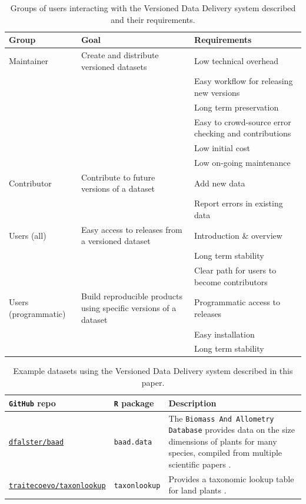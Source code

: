 \documentclass[english]{article}
\newcommand{\ghsmurl}[1]{{\footnotesize\href{https://github.com/#1}{\nolinkurl{#1}}}}
\begin{document}
\begin{table}[h!]
\centering
\caption{Groups of users interacting with the Versioned Data Delivery system described and their requirements.}
{\footnotesize
\vspace{1cm}
  \begin{tabular}{p{2cm}p{4cm}p{6cm}}
  \hline
  \textbf{Group} & \textbf{Goal} & \textbf{Requirements} \\ \hline
  Maintainer & Create and distribute versioned datasets & Low technical overhead \\
    & & Easy workflow for releasing new versions \\
    & & Long term preservation \\
    & & Easy to crowd-source error checking and contributions \\
    & & Low initial cost \\
    & & Low on-going maintenance \\
  Contributor & Contribute to future versions of a dataset & Add new data \\
    & & Report errors in existing data \\
  Users (all) & Easy access to releases from a versioned dataset & Introduction \& overview \\
    & & Long term stability \\
    & & Clear path for users to become contributors \\
  Users (programmatic) & Build reproducible products using specific versions of a dataset & Programmatic access to releases \\
    & & Easy installation \\
    & & Long term stability \\
  \hline
  \end{tabular}
}
\label{tab:user_requirements}
\end{table}

\newpage

\begin{table}[h!]
\centering
\caption{Example datasets using the Versioned Data Delivery system described in this paper.}
{\footnotesize
\vspace{1cm}

  \begin{tabular}{p{3.5cm}p{2cm}p{6.5cm}}
  \hline
   \textbf{\texttt{GitHub} repo} & \textbf{\texttt{R} package} & \textbf{Description} \\ \hline
  \ghsmurl{dfalster/baad} & \texttt{baad.data} & The \texttt{Biomass And Allometry Database} provides data on the size dimensions of plants for many species, compiled from multiple scientific papers \cite{Falster-2015}.\\
  \ghsmurl{traitecoevo/taxonlookup} & \texttt{taxonlookup} & Provides a taxonomic lookup table for land plants \cite{Pennell-2015a}.\\
  \hline
  \end{tabular}
  }
\label{tab:examples}
\end{table}
\end{document}
